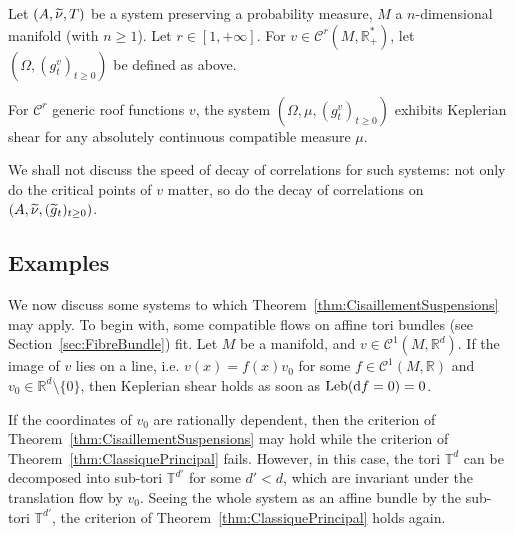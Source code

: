 \documentclass[10pt]{amsart}
\theoremstyle{definition}\newtheorem{defi}[theo]{Definition}\newtheorem{rema}[theo]{Remark}\newtheorem{exam}[theo]{Example}\newtheorem{exem}[theo]{Example}\newtheorem{nota}[theo]{Notation}
\DeclareMathOperator{\Leb}{Leb}
\newcommand{\R}{\mathbb{R}}
\newcommand{\Tbb}{\mathbb{T}}
\newcommand{\Ccal}{\mathcal{C}}
\newcommand{\de}{{\rm d}}
\let\oldtilde\tilde
\renewcommand*{\tilde}[1]{\mathchoice{\widetilde{#1}}{\widetilde{#1}}{\oldtilde{#1}}{\oldtilde{#1}}}\let\oldhat\hat
\renewcommand*{\hat}[1]{\mathchoice{\widehat{#1}}{\widehat{#1}}{\oldhat{#1}}{\oldhat{#1}}}\let\oldforall\forall
\renewcommand*{\forall}{\mathrel{\oldforall}}
\begin{document}
\begin{coro}
Let $(A, \tilde{\nu}, T)$ be a system preserving a probability measure, $M$ a $n$-dimensional manifold (with $n \geq 1$). Let $r \in [1, + \infty]$. For $v \in \Ccal^r (M, \R_+^*)$, let $(\Omega, (g_t^v)_{t \geq 0})$ be defined as above.


For $\Ccal^r$ generic roof functions $v$, the system $(\Omega, \mu, (g_t^v)_{t \geq 0})$ exhibits Keplerian shear for any absolutely continuous compatible measure $\mu$.
\end{coro}



We shall not discuss the speed of decay of correlations for such systems: not only do the critical points of $v$ matter, so do the decay of correlations on $(A, \tilde{\nu}, (\tilde{g}_t)_{t \geq 0})$.


\subsection{Examples}\label{subsec:AllongeExemple}

We now discuss some systems to which Theorem~\ref{thm:CisaillementSuspensions} may apply. To begin with, some compatible flows on affine tori bundles (see Section~\ref{sec:FibreBundle}) fit. Let $M$ be a manifold, and $v \in \Ccal^1 (M, \R^d)$. If the image of $v$ lies on a line, i.e. $v(x) = f(x) v_0$ for some $f \in \Ccal^1 (M, \R)$ and $v_0 \in \R^d \setminus \{0\}$, then Keplerian shear holds as soon as $\Leb (\de f =0) = 0$.


If the coordinates of $v_0$ are rationally dependent, then the criterion of Theorem~\ref{thm:CisaillementSuspensions} may hold while the criterion of Theorem~\ref{thm:ClassiquePrincipal} fails. However, in this case, the tori $\Tbb^d$ can be decomposed into sub-tori $\Tbb^{d'}$ for some $d'<d$, which are invariant under the translation flow by $v_0$. Seeing the whole system as an affine bundle by the sub-tori $\Tbb^{d'}$, the criterion of Theorem~\ref{thm:ClassiquePrincipal} holds again.

\end{document}
